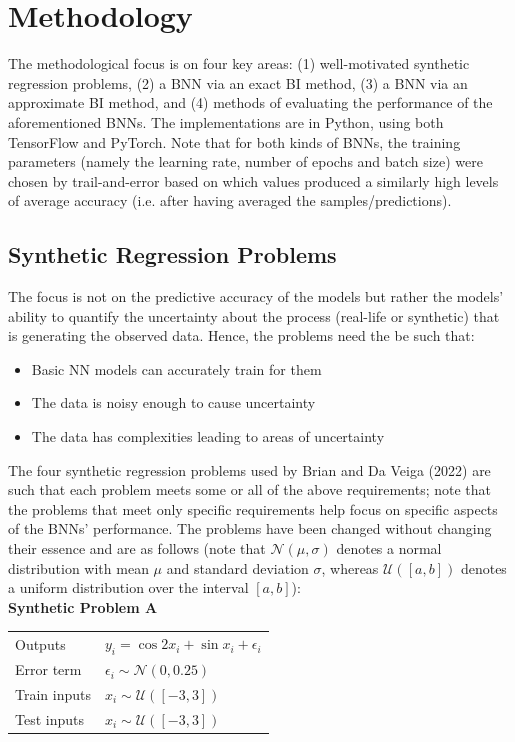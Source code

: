 \documentclass[conference]{IEEEtran}
\begin{document}
\section{Methodology}
The methodological focus is on four key areas: (1) well-motivated synthetic regression problems, (2) a BNN via an exact BI method, (3) a BNN via an approximate BI method, and (4) methods of evaluating the performance of the aforementioned BNNs. The implementations are in Python, using both TensorFlow and PyTorch. Note that for both kinds of BNNs, the training parameters (namely the learning rate, number of epochs and batch size) were chosen by trail-and-error based on which values produced a similarly high levels of average accuracy (i.e. after having averaged the samples/predictions).

\subsection{Synthetic Regression Problems}
The focus is not on the predictive accuracy of the models but rather the models' ability to quantify the uncertainty about the process (real-life or synthetic) that is generating the observed data. Hence, the problems need the be such that:\\

\begin{itemize}
    \item Basic NN models can accurately train for them
    \item The data is noisy enough to cause uncertainty
    \item The data has complexities leading to areas of uncertainty\\
\end{itemize}

The four synthetic regression problems used by Brian and Da Veiga (2022) are such that each problem meets some or all of the above requirements; note that the problems that meet only specific requirements help focus on specific aspects of the BNNs' performance. The problems have been changed without changing their essence and are as follows (note that $\mathcal{N}(\mu, \sigma)$ denotes a normal distribution with mean $\mu$ and standard deviation $\sigma$, whereas $\mathcal{U}([a, b])$ denotes a uniform distribution over the interval $[a, b]$):\\

\textbf{Synthetic Problem A}

\begin{tabular}{m{2.5cm} | m{6cm}}
    Outputs & $y_i = \cos{2x_i} + \sin{x_i} + \epsilon_i$\\
    Error term & $\epsilon_i \sim \mathcal{N}(0, 0.25)$\\
    Train inputs & $x_i \sim \mathcal{U}([-3, 3])$\\
    Test inputs & $x_i \sim \mathcal{U}([-3, 3])$
\end{tabular}\\
\end{document}
